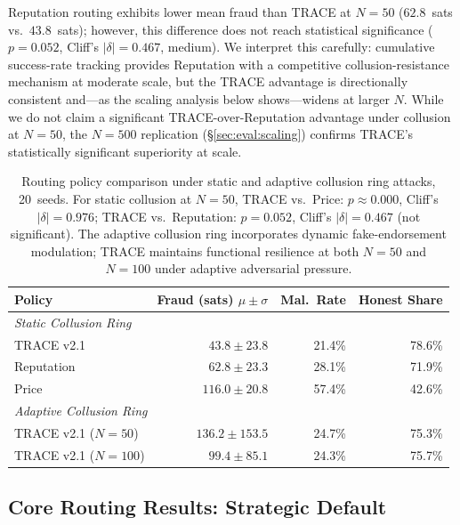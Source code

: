 \documentclass[sigconf,nonacm,10pt]{acmart}
\begin{document}
Reputation routing exhibits lower mean fraud than TRACE at
$N = 50$ ($62.8$~sats vs.\ $43.8$~sats); however, this difference does not reach statistical significance ($p = 0.052$, Cliff's $|\delta| = 0.467$, medium). We interpret this carefully:
cumulative success-rate tracking provides Reputation with a
competitive collusion-resistance mechanism at moderate scale, but
the TRACE advantage is directionally consistent and---as the
scaling analysis below shows---widens at larger $N$. While we do not
claim a significant TRACE-over-Reputation advantage under
collusion at $N{=}50$, the $N{=}500$ replication
(\S\ref{sec:eval:scaling}) confirms TRACE's statistically
significant superiority at scale.

\begin{table}[t]
  \centering
  \caption{Routing policy comparison under static and adaptive collusion
    ring attacks, 20~seeds. For static collusion at $N{=}50$, TRACE vs.~Price:
    $p \approx 0.000$, Cliff's $|\delta|=0.976$; TRACE
    vs.~Reputation: $p=0.052$, Cliff's $|\delta|=0.467$
    (not significant). The adaptive collusion ring incorporates dynamic
    fake-endorsement modulation; TRACE maintains functional resilience at both
    $N{=}50$ and $N{=}100$ under adaptive adversarial pressure.}
  \label{tab:collusion}
  \small
  \begin{tabular}{lrrr}
    \toprule
    Policy & Fraud (sats) $\mu \pm \sigma$
           & Mal.\ Rate & Honest Share \\
    \midrule
    \multicolumn{4}{l}{\textit{Static Collusion Ring}} \\
    TRACE v2.1      & $43.8 \pm 23.8$  & 21.4\% & 78.6\% \\
    Reputation      & $62.8 \pm 23.3$  & 28.1\% & 71.9\% \\
    Price           & $116.0 \pm 20.8$ & 57.4\% & 42.6\% \\
    \midrule
    \multicolumn{4}{l}{\textit{Adaptive Collusion Ring}} \\
    TRACE v2.1 ($N{=}50$)  & $136.2 \pm 153.5$ & 24.7\% & 75.3\% \\
    TRACE v2.1 ($N{=}100$) & $99.4 \pm 85.1$   & 24.3\% & 75.7\% \\
    \bottomrule
  \end{tabular}
\end{table}

\subsection{Core Routing Results: Strategic Default}
\label{sec:eval:strategic}
\end{document}
